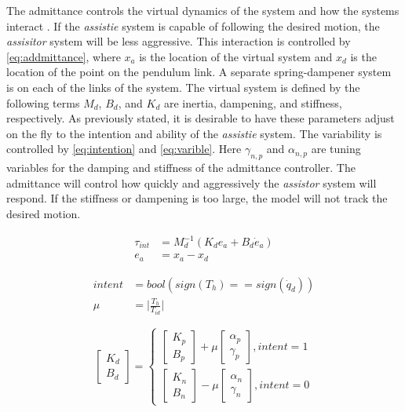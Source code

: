 The admittance controls the virtual dynamics of the system and how the systems interact \cite{faulring2005haptic}. If the \textit{assistie} system is capable of following the desired motion, the \textit{assisitor} system will be less aggressive. This interaction is controlled by \autoref{eq:addmittance}, where $x_a$ is the location of the virtual system and $x_d$ is the location of the point on the pendulum link. A separate spring-dampener system is on each of the links of the system. The virtual system is defined by the following terms $M_d$, $B_d$, and $K_d$ are inertia, dampening, and stiffness, respectively. As previously stated, it is desirable to have these parameters adjust on the fly to the intention and ability of the \textit{assistie} system. The variability is controlled by \autoref{eq:intention} and \autoref{eq:varible}. Here $\gamma_{n,p}$ and $\alpha_{n,p}$ are tuning variables for the damping and stiffness of the admittance controller. The admittance will control how quickly and aggressively the \textit{assistor} system will respond. If the stiffness or dampening is too large, the model will not track the desired motion.   

\begin{equation}
    \begin{aligned}
        \tau_{int} &= M_d^{-1}( K_d e_a + B_d \dot{e}_a)  \\
        e_a &= x_a - x_d 
    \end{aligned}
    \label{eq:addmittance}
\end{equation}

\begin{equation}
    \begin{aligned}
         intent &= bool ( sign(T_h) == sign(\dot{q}_d) ) \\
         \mu &= \Big|\frac{T_h}{T_{id}} \Big|
    \end{aligned}
    \label{eq:intention}
\end{equation}



\begin{equation}
    \begin{bmatrix} K_d \\ B_d \end{bmatrix} = \begin{cases}
        \begin{bmatrix} K_{p} \\ B_{p} \end{bmatrix} + \mu  \begin{bmatrix} \alpha_p  \\ \gamma_p \end{bmatrix}, intent = 1 \\
        \begin{bmatrix} K_{n} \\ B_{n} \end{bmatrix} - \mu  \begin{bmatrix} \alpha_n  \\ \gamma_n \end{bmatrix}, intent = 0
  \end{cases}
  \label{eq:varible}
\end{equation}


